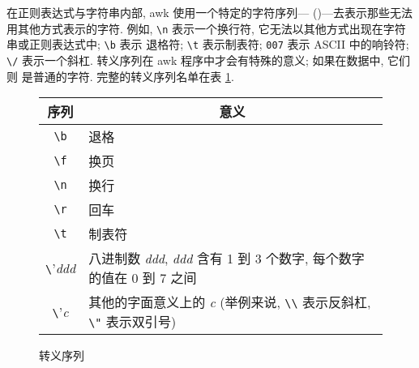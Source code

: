 在正则表达式与字符串内部, awk 使用一个特定的字符序列---{}
(){}---去表示那些无法用其他方式表示的字符. 例如,
\verb'\n'
表示一个换行符, 它无法以其他方式出现在字符串或正则表达式中; \verb'\b' 表示
退格符; \verb'\t' 表示制表符; \verb'007' 表示 ASCII 中的响铃符; \verb'\/'
表示一个斜杠. 转义序列在 awk 程序中才会有特殊的意义; 如果在数据中, 它们则
是普通的字符. 完整的转义序列名单在表 \ref{tbl:escape_sequences}.
\begin{figure}[ht]
\captionsetup{type=table}
\caption{转义序列}
\label{tbl:escape_sequences}
\begin{center}
\begin{tabular}{c|l}
    \hline
    \hline
    序列        &  \multicolumn{1}{c}{意义}  \\
    \hline
    \verb'\b'   & 退格  \\
    \verb'\f'   & 换页  \\
    \verb'\n'   & 换行 \\
    \verb'\r'   & 回车 \\
    \verb'\t'    & 制表符    \\
    \verb'\'\textit{ddd} & 八进制数 \textit{ddd}, \textit{ddd}
        含有 1 到 3 个数字, 每个数字的值在 0 到 7 之间 \\
    \verb'\'\textit{c} & 其他的字面意义上的 \textit{c}
        (举例来说, \verb'\\' 表示反斜杠, \verb'\"' 表示双引号) \\
    \hline
\end{tabular}
\end{center}
\end{figure}

